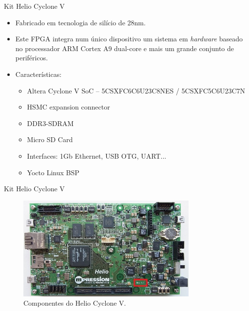 \documentclass[aspectratio=169]{beamer}
\begin{document}
	
	\begin{frame}{Kit Helio Cyclone V}
		\begin{itemize}
			\setlength\itemsep{1em}
			\item Fabricado em tecnologia de silício de 28nm.
			
			\item Este FPGA integra num único dispositivo um sistema em \textit{hardware} baseado no processador ARM Cortex A9 dual-core e mais um grande conjunto de periféricos.
			
			\item Características:
			\begin{itemize}
				\setlength\itemsep{0.4em}
				\item Altera Cyclone V SoC -- 5CSXFC6C6U23C8NES / 5CSXFC5C6U23C7N
				\item HSMC expansion connector
				\item DDR3-SDRAM
				\item Micro SD Card
				\item Interfaces: 1Gb Ethernet, USB OTG, UART...
				\item Yocto Linux BSP
			\end{itemize}
		\end{itemize}
	\end{frame}
	
	\begin{frame}{Kit Helio Cyclone V}
		\begin{figure}[h]
			\centering
			\includegraphics[width=0.8\textwidth]{img/imobilis/helio-foto.jpg}
			\caption{Componentes do Helio Cyclone V.}
			\label{fig:helio-foto}
		\end{figure}
	\end{frame}
	
\end{document}
